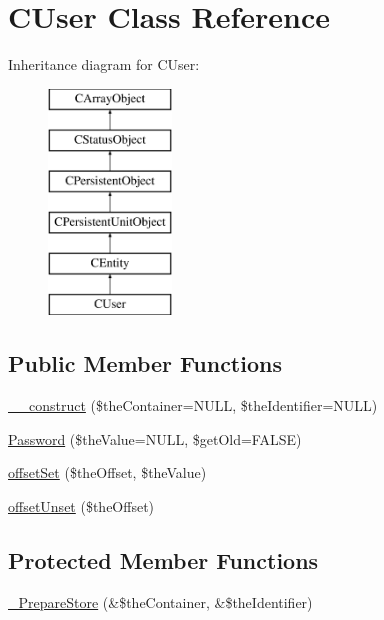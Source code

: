 \hypertarget{class_c_user}{\section{C\-User Class Reference}
\label{class_c_user}
}
Inheritance diagram for C\-User\-:\begin{figure}[H]
\begin{center}
\leavevmode
\includegraphics[height=6.000000cm]{class_c_user}
\end{center}
\end{figure}
\subsection*{Public Member Functions}
\begin{DoxyCompactItemize}
\item 
\hyperlink{class_c_user_a728ac6fd50a9f9e18dfe2fa547d5c798}{\-\_\-\-\_\-construct} (\$the\-Container=N\-U\-L\-L, \$the\-Identifier=N\-U\-L\-L)
\item 
\hyperlink{class_c_user_a0e6f1cf51ad23f971ed0999f8d248c8d}{Password} (\$the\-Value=N\-U\-L\-L, \$get\-Old=F\-A\-L\-S\-E)
\item 
\hyperlink{class_c_user_aace3446b9cacfe28cc1937c608fcc999}{offset\-Set} (\$the\-Offset, \$the\-Value)
\item 
\hyperlink{class_c_user_aed8557e18a89d868cedf5a48328b33b2}{offset\-Unset} (\$the\-Offset)
\end{DoxyCompactItemize}
\subsection*{Protected Member Functions}
\begin{DoxyCompactItemize}
\item 
\hyperlink{class_c_user_a031f5d13fe837cf445006ee21023bf3e}{\-\_\-\-Prepare\-Store} (\&\$the\-Container, \&\$the\-Identifier)
\end{DoxyCompactItemize}



